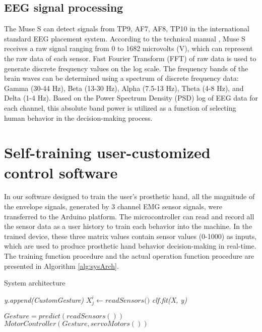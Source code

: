 \subsection{EEG signal processing}
The Muse S can detect signals from TP9, AF7, AF8, TP10 in the
international standard EEG placement system. According to the technical manual \cite{[???}, Muse S receives a raw signal ranging from 0 to 1682 microvolts (V), which can represent the raw data of each sensor. Fast Fourier Transform (FFT) of raw data is used to generate discrete frequency values on the log scale. The frequency bands of the brain waves can be determined using a spectrum of discrete frequency data: Gamma (30-44 Hz), Beta (13-30 Hz), Alpha (7.5-13 Hz), Theta (4-8 Hz), and Delta (1-4 Hz). Based on the Power Spectrum Density (PSD) log of EEG data for each channel, this absolute band power is utilized as a function of selecting human behavior in the decision-making process.
\section{Self-training user-customized control software}

In our software designed to train the user's prosthetic hand, all the
magnitude of the envelope signals, generated by 3 channel EMG sensor
signals, were transferred to the Arduino platform. The microcontroller
can read and record all the sensor data as a user history to train
each behavior into the machine. In the trained device, these three
matrix values contain sensor values (0-1000) as inputs, which are used
to produce prosthetic hand behavior decision-making in real-time.  The
training function procedure and the actual operation function
procedure are presented in Algorithm \ref{alg:sysArch}.

\begin{algorithm}
\caption{System architecture}
\label{alg:sysArch}
\begin{algorithmic}[1]

\State \textit{y.append(CustomGesture)}
        \State $ \textit{$X_{j}^i$} \gets \textit{readSensors()}$
        \EndFor
    \EndFor
\State \textit{clf.fit(X, y)}
\EndProcedure

\State \textit{ $Gesture = predict(readSensors()) $}
\State \textit{ $MotorController(Gesture, servoMotors())$ }
\EndWhile\label{endwhile}
\EndProcedure
\end{algorithmic}
\end{algorithm}

